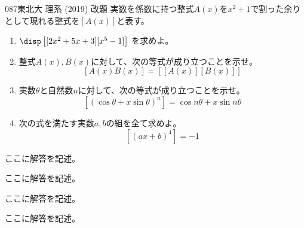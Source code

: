 \begin{thm}{087}{}{東北大 理系 (2019) 改題}
 実数を係数に持つ整式$A(x)$を$x^2+1$で割った余りとして現れる整式を$\left[A(x)\right]$と表す。
 \begin{enumerate}
  \item $\disp \left[ [2x^2+5x+3] [x^5-1] \right]$ を求めよ。
  \item 整式$A(x), B(x)$に対して、次の等式が成り立つことを示せ。
	\[ [A(x) B(x)]=\left[ [A(x)] [B(x)]\right] \]
  \item 実数$\theta$と自然数$n$に対して、次の等式が成り立つことを示せ。
	\[ \left[ (\cos\theta+x\sin\theta)^n \right] = \cos n\theta + x\sin n\theta \]
  \item 次の式を満たす実数$a, b$の組を全て求めよ。
	\[ \left[ (ax+b)^4 \right] = -1 \]
 \end{enumerate}
\end{thm}

ここに解答を記述。

ここに解答を記述。

ここに解答を記述。

ここに解答を記述。